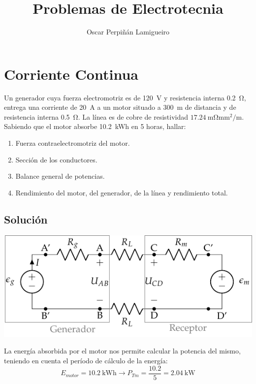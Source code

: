 \documentclass[10pt]{article}
\begin{document}
\title{Problemas de Electrotecnia}

\date{}

\author{Oscar Perpiñán Lamigueiro}

\maketitle

\section*{Corriente Continua}

Un generador cuya fuerza electromotriz es de \SI{120}{V} y resistencia interna \SI{0.2}{\ohm}, entrega una corriente de \SI{20}{\ampere} a un motor situado a \SI{300}{\meter} de distancia y de resistencia interna \SI{0.5}{\ohm}. La línea es de cobre de resistividad $\SI{17.24}{\milli\ohm\milli\meter\squared\per\meter}$. Sabiendo que el motor absorbe \SI{10.2}{\kWh} en 5 horas, hallar: 
\begin{enumerate}
\item Fuerza contraelectromotriz del motor.
\item Sección de los conductores.
\item Balance general de potencias.
\item Rendimiento del motor, del generador, de la línea y rendimiento total.
\end{enumerate}

\subsection*{Solución}

\begin{center}
  \includegraphics{../figs/circuito_lkv}
\end{center}

La energía absorbida por el motor nos permite calcular la potencia del mismo, teniendo en cuenta el período de cálculo de la energía:
\[
  E_{motor} = \SI{10.2}{\kWh} \rightarrow P_{Tm} = \frac{10.2}{5} = \SI{2.04}{\kilo\watt}
\]
\end{document}
